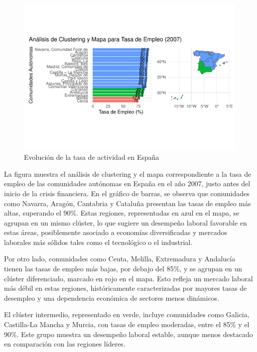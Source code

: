 \documentclass[notspecified,article,submit,moreauthors,pdftex]{Definitions/mdpi}
\begin{document}
\begin{figure}[h]

{\centering \includegraphics[width=1\linewidth]{ProyectoAED2024_files/figure-latex/unnamed-chunk-35-1} 

}

\caption{Evolución de la tasa de actividad en España}\label{fig:unnamed-chunk-35}
\end{figure}

La figura muestra el análisis de clustering y el mapa correspondiente a
la tasa de empleo de las comunidades autónomas en España en el año 2007,
justo antes del inicio de la crisis financiera. En el gráfico de barras,
se observa que comunidades como Navarra, Aragón, Cantabria y Cataluña
presentan las tasas de empleo más altas, superando el 90\%. Estas
regiones, representadas en azul en el mapa, se agrupan en un mismo
clúster, lo que sugiere un desempeño laboral favorable en estas áreas,
posiblemente asociado a economías diversificadas y mercados laborales
más sólidos tales como el tecnológico o el industrial.

Por otro lado, comunidades como Ceuta, Melilla, Extremadura y Andalucía
tienen las tasas de empleo más bajas, por debajo del 85\%, y se agrupan
en un clúster diferenciado, marcado en rojo en el mapa. Esto refleja un
mercado laboral más débil en estas regiones, históricamente
caracterizadas por mayores tasas de desempleo y una dependencia
económica de sectores menos dinámicos.

El clúster intermedio, representado en verde, incluye comunidades como
Galicia, Castilla-La Mancha y Murcia, con tasas de empleo moderadas,
entre el 85\% y el 90\%. Este grupo muestra un desempeño laboral
estable, aunque menos destacado en comparación con las regiones líderes.
\end{document}
